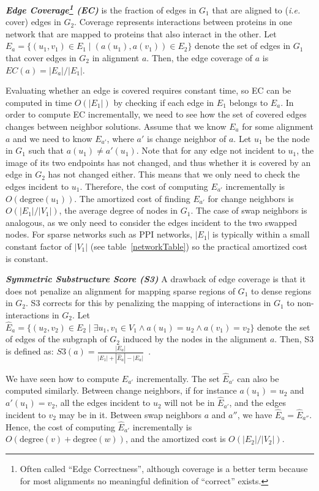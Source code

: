 \documentclass{bioinfo}
\newcommand{\Eb}{\hat{E}}
\begin{document}
\begin{methods}
\emph{\textbf{Edge Coverage\footnote{Often called ``Edge Correctness'', although coverage is a better term because for most alignments no meaningful definition of ``correct'' exists.} (EC)}} is the fraction of edges in $G_1$ that are aligned to ({\it i.e.} cover) edges in $G_2$. Coverage represents interactions between proteins in one network that are mapped to proteins that also interact in the other. Let $E_a=\{(u_1,v_1)\in E_1\mid (a(u_1),a(v_1))\in E_2\}$ denote the set of edges in $G_1$ that cover edges in $G_2$ in alignment $a$. Then, the edge coverage of $a$ is $EC(a)={|E_a|}/{|E_1|}$. 

Evaluating whether an edge is covered requires constant time, so EC can be computed in time $O(|E_1|)$ by checking if each edge in $E_1$ belongs to $E_a$. In order to compute EC incrementally, we need to see how the set of covered edges changes between neighbor solutions. Assume that we know $E_a$ for some alignment $a$ and we need to know $E_{a'}$, where $a'$ is change neighbor of $a$. Let $u_1$ be the node in $G_1$ such that $a(u_1)\not= a'(u_1)$. Note that for any edge not incident to $u_1$, the image of its two endpoints has not changed, and thus whether it is covered by an edge in $G_2$ has not changed either. This means that we only need to check the edges incident to $u_1$. Therefore, the cost of computing $E_{a'}$ incrementally is $O(\mbox{degree}(u_1))$. The amortized cost of finding $E_{a'}$ for change neighbors is $O(|E_1|/|V_1|)$, the average degree of nodes in $G_1$. The case of swap neighbors is analogous, as we only need to consider the edges incident to the two swapped nodes. For sparse networks such as PPI networks, $|E_1|$ is typically within a small constant factor of $|V_1|$ (see table~\ref{networkTable}) so the practical amortized cost is constant.

\emph{\textbf{Symmetric Substructure Score (S3)}} A drawback of edge coverage is that it does not penalize an alignment for mapping sparse regions of $G_1$ to dense regions in $G_2$. S3 corrects for this by penalizing the mapping of interactions in $G_1$ to non-interactions in $G_2$. Let $\Eb_a=\{(u_2,v_2)\in E_2 \mid \exists u_1,v_1 \in V_1 \wedge a(u_1)=u_2 \wedge a(v_1)=v_2\}$ denote the set of edges of the subgraph of $G_2$ induced by the nodes in the alignment $a$. Then, S3 is defined as: $S3(a)=\frac{|E_a|}{|E_1|+|\Eb_a|-|E_a|}$~\citep{MAGNA}.

We have seen how to compute $E_{a'}$ incrementally. The set $\Eb_{a'}$ can also be computed similarly. Between change neighbors, if for instance $a(u_1)=u_2$ and $a'(u_1)=v_2$, all the edges incident to $u_2$ will not be in $\Eb_{a'}$, and the edges incident to $v_2$ may be in it. Between swap neighbors $a$ and $a''$, we have $\Eb_{a}=\Eb_{a''}$. Hence, the cost of computing $\Eb_{a'}$ incrementally is $O(\mbox{degree}(v)+\mbox{degree}(w))$, and the amortized cost is $O(|E_2|/|V_2|)$.


\end{methods}
\end{document}
